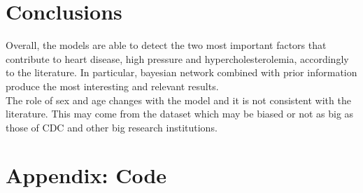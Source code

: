\documentclass{article}
\begin{document}
\section{Conclusions}
Overall, the models are able to detect the two most important factors that contribute to heart disease, high pressure and hypercholesterolemia, accordingly to the literature. In particular, bayesian network combined with prior information produce the most interesting and relevant results.\\
The role of sex and age changes with the model and it is not consistent with the literature. This may come from the dataset which may be biased or not as big as those of CDC and other big research institutions.


\newpage

\section{Appendix: Code}
\end{document}
